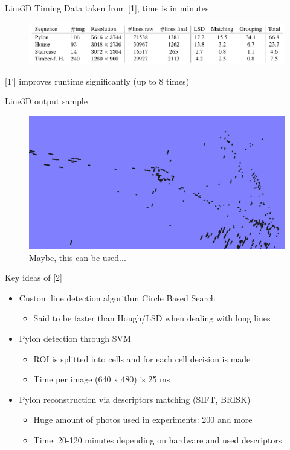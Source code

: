 \documentclass{beamer}
\begin{document}
\begin{frame}[t, fragile]{Line3D Timing}
Data taken from [1], time is in minutes
\begin{figure}
\centering
\includegraphics[scale=0.25]{line3dtime}
\end{figure}

[1'] improves runtime significantly (up to 8 times)
\end{frame}


\begin{frame}[t, fragile]{Line3D output sample}

\begin{figure}
\includegraphics[width=1\linewidth]{line3d_output}
\captionsetup{labelformat=empty}
\caption{Maybe, this can be used...}
\end{figure}
\end{frame}



\begin{frame}[t, fragile]{Key ideas of [2]}
\begin{itemize}
\item Custom line detection algorithm Circle Based Search
\begin{itemize}
\item Said to be faster than Hough/LSD when dealing with long lines
\end{itemize}
\item Pylon detection through SVM
\begin{itemize}
\item ROI is splitted into cells and for each cell decision is made
\item Time per image (640 x 480) is 25 ms 
\end{itemize}
\item Pylon reconstruction via descriptors matching (SIFT, BRISK)
\begin{itemize}
\item Huge amount of photos used in experiments: 200 and more
\item Time: 20-120 minutes depending on hardware and used descriptors
\end{itemize}
\end{itemize}
\end{frame}
\end{document}

